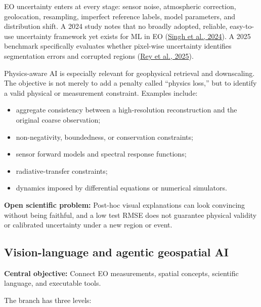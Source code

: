 \documentclass[
  a4paper,
  11pt]{article}
\providecommand{\tightlist}{%
  \setlength{\itemsep}{0pt}\setlength{\parskip}{0pt}}
\begin{document}
EO uncertainty enters at every stage: sensor noise, atmospheric
correction, geolocation, resampling, imperfect reference labels, model
parameters, and distribution shift. A 2024 study notes that no broadly
adopted, reliable, easy-to-use uncertainty framework yet exists for ML
in EO (\href{https://www.nature.com/articles/s41598-024-65954-w}{Singh
et al., 2024}). A 2025 benchmark specifically evaluates whether
pixel-wise uncertainty identifies segmentation errors and corrupted
regions (\href{https://arxiv.org/abs/2510.19586}{Rey et al., 2025}).

Physics-aware AI is especially relevant for geophysical retrieval and
downscaling. The objective is not merely to add a penalty called
``physics loss,'' but to identify a valid physical or measurement
constraint. Examples include:

\begin{itemize}
\tightlist
\item
  aggregate consistency between a high-resolution reconstruction and the
  original coarse observation;
\item
  non-negativity, boundedness, or conservation constraints;
\item
  sensor forward models and spectral response functions;
\item
  radiative-transfer constraints;
\item
  dynamics imposed by differential equations or numerical simulators.
\end{itemize}

\textbf{Open scientific problem:} Post-hoc visual explanations can look
convincing without being faithful, and a low test RMSE does not
guarantee physical validity or calibrated uncertainty under a new region
or event.

\hypertarget{vision-language-and-agentic-geospatial-ai}{%
\subsection{Vision-language and agentic geospatial
AI}\label{vision-language-and-agentic-geospatial-ai}}

\textbf{Central objective:} Connect EO measurements, spatial concepts,
scientific language, and executable tools.

The branch has three levels:
\end{document}
